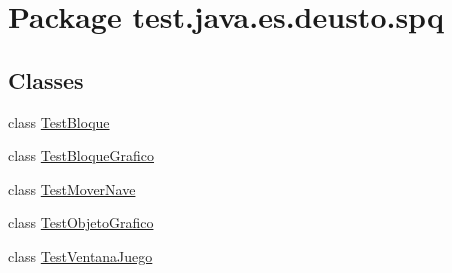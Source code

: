 \hypertarget{namespacetest_1_1java_1_1es_1_1deusto_1_1spq}{}\section{Package test.\+java.\+es.\+deusto.\+spq}
\label{namespacetest_1_1java_1_1es_1_1deusto_1_1spq}
\subsection*{Classes}
\begin{DoxyCompactItemize}
\item 
class \hyperlink{classtest_1_1java_1_1es_1_1deusto_1_1spq_1_1_test_bloque}{Test\+Bloque}
\item 
class \hyperlink{classtest_1_1java_1_1es_1_1deusto_1_1spq_1_1_test_bloque_grafico}{Test\+Bloque\+Grafico}
\item 
class \hyperlink{classtest_1_1java_1_1es_1_1deusto_1_1spq_1_1_test_mover_nave}{Test\+Mover\+Nave}
\item 
class \hyperlink{classtest_1_1java_1_1es_1_1deusto_1_1spq_1_1_test_objeto_grafico}{Test\+Objeto\+Grafico}
\item 
class \hyperlink{classtest_1_1java_1_1es_1_1deusto_1_1spq_1_1_test_ventana_juego}{Test\+Ventana\+Juego}
\end{DoxyCompactItemize}

